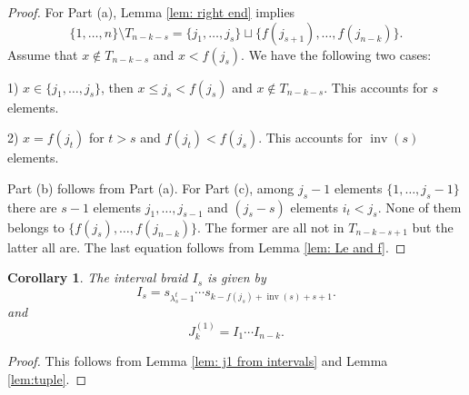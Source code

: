 \documentclass[10pt]{amsart}
\theoremstyle{plain}
\newtheorem{cor}[thm]{Corollary}
\theoremstyle{definition}
\theoremstyle{remark}
\numberwithin{equation}{section}
\DeclareMathOperator{\inv}{inv}
\begin{document}
\begin{proof}
For Part (a), Lemma \ref{lem: right end} implies
$$
\{1,\ldots,n\}\setminus T_{n-k-s}=\{j_1,\ldots,j_s\}\sqcup 
\{f(j_{s+1}),\ldots,f(j_{n-k})\}.
$$
Assume that $x\notin T_{n-k-s}$ and $x<f(j_s)$.
We have the following two cases:

1) $x\in \{j_1,\ldots,j_s\}$, then $x\le j_s< f(j_s)$ and $x\notin T_{n-k-s}$. This accounts for $s$ elements. 

2) $x=f(j_t)$ for $t>s$ and $f(j_t)<f(j_s)$. This accounts for $\inv(s)$ elements. 

\noindent Part (b) follows from Part (a). For Part (c), among $j_s-1$ elements $\{1,\ldots,j_s-1\}$ there are $s-1$ elements $j_1,\ldots,j_{s-1}$ and $(j_s-s)$ elements $i_t<j_s$. None of them belongs to $\{f(j_s),\ldots,f(j_{n-k})\}.$
The former are all not in $T_{n-k-s+1}$ but the latter all are.
The last equation follows from Lemma \ref{lem: Le and f}.
\end{proof}

\begin{cor}\label{cor: intervals juggling}
The interval braid $I_{s}$ is given by
\[
I_{s} = s_{\lambda_s^{t}-1}\cdots s_{k-f(j_s) +\inv(s) + s +1}.
\]
and 
$$
J^{(1)}_k= I_{1}\cdots I_{n-k}.
$$
\end{cor}

\begin{proof}
This follows from Lemma \ref{lem: j1 from intervals} and Lemma \ref{lem:tuple}.
\end{proof}
\end{document}
